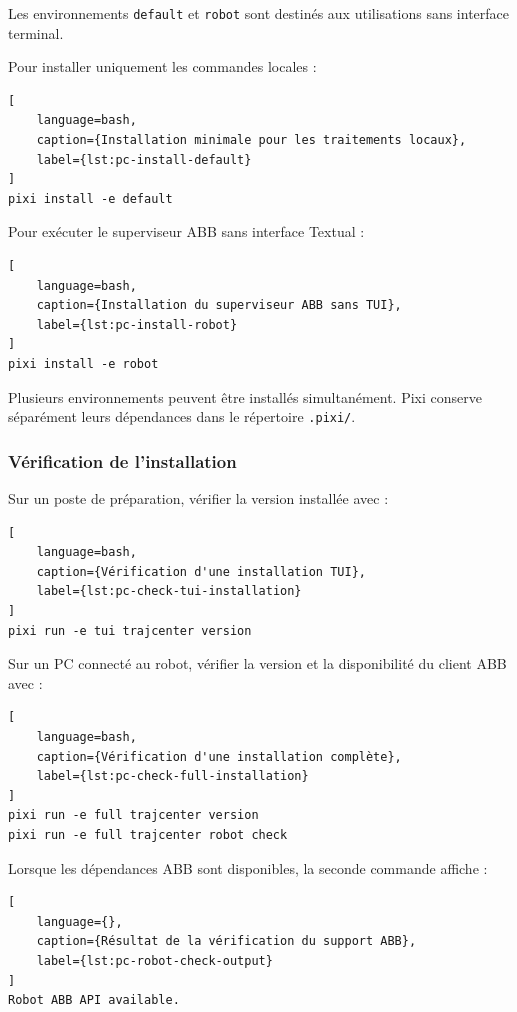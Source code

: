 \documentclass{rapportENSAM}
\begin{document}
Les environnements \texttt{default} et \texttt{robot} sont destinés aux
utilisations sans interface terminal.

Pour installer uniquement les commandes locales :

\begin{lstlisting}[
    language=bash,
    caption={Installation minimale pour les traitements locaux},
    label={lst:pc-install-default}
]
pixi install -e default
\end{lstlisting}

Pour exécuter le superviseur ABB sans interface Textual :

\begin{lstlisting}[
    language=bash,
    caption={Installation du superviseur ABB sans TUI},
    label={lst:pc-install-robot}
]
pixi install -e robot
\end{lstlisting}

Plusieurs environnements peuvent être installés simultanément. Pixi conserve
séparément leurs dépendances dans le répertoire \texttt{.pixi/}.


\subsubsection{Vérification de l'installation}
\label{subsubsec:pc-installation-check}

Sur un poste de préparation, vérifier la version installée avec :

\begin{lstlisting}[
    language=bash,
    caption={Vérification d'une installation TUI},
    label={lst:pc-check-tui-installation}
]
pixi run -e tui trajcenter version
\end{lstlisting}

Sur un PC connecté au robot, vérifier la version et la disponibilité du client
ABB avec :

\begin{lstlisting}[
    language=bash,
    caption={Vérification d'une installation complète},
    label={lst:pc-check-full-installation}
]
pixi run -e full trajcenter version
pixi run -e full trajcenter robot check
\end{lstlisting}

Lorsque les dépendances ABB sont disponibles, la seconde commande affiche :

\begin{lstlisting}[
    language={},
    caption={Résultat de la vérification du support ABB},
    label={lst:pc-robot-check-output}
]
Robot ABB API available.
\end{lstlisting}
\end{document}
